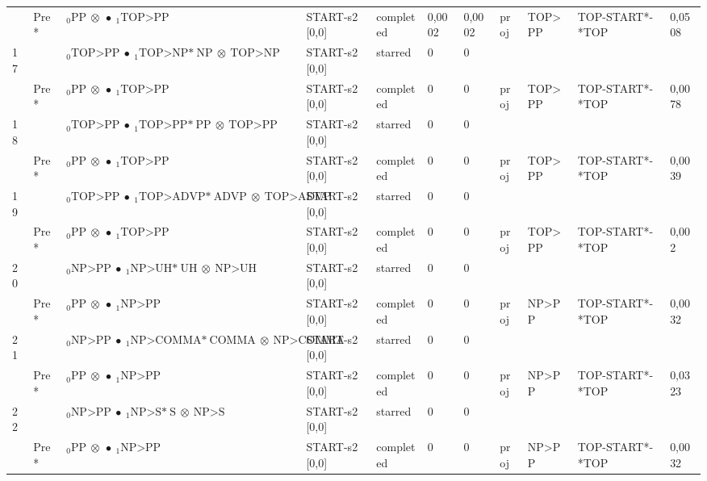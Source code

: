\documentclass[10pt]{article}
\begin{document}
\begin{longtable}[htbp]{lllllllllll}
 & Pre *& $ {}_0 \textrm{PP} \  \otimes \  \bullet \ {}_{1} \textrm{TOP>PP} $ & START-s2 [0,0] & completed & 0,0002 & 0,0002 & proj & TOP>PP & TOP-START*-*TOP & 0,0508 \\ 
17 & & $ {}_0 \textrm{TOP>PP} \  \bullet \ {}_{1} \textrm{TOP>NP*} \ \textrm{NP} \  \otimes \ \textrm{TOP>NP} $ & START-s2 [0,0] & starred & 0 & 0 & & & & \\ 
 & Pre *& $ {}_0 \textrm{PP} \  \otimes \  \bullet \ {}_{1} \textrm{TOP>PP} $ & START-s2 [0,0] & completed & 0 & 0 & proj & TOP>PP & TOP-START*-*TOP & 0,0078 \\ 
18 & & $ {}_0 \textrm{TOP>PP} \  \bullet \ {}_{1} \textrm{TOP>PP*} \ \textrm{PP} \  \otimes \ \textrm{TOP>PP} $ & START-s2 [0,0] & starred & 0 & 0 & & & & \\ 
 & Pre *& $ {}_0 \textrm{PP} \  \otimes \  \bullet \ {}_{1} \textrm{TOP>PP} $ & START-s2 [0,0] & completed & 0 & 0 & proj & TOP>PP & TOP-START*-*TOP & 0,0039 \\ 
19 & & $ {}_0 \textrm{TOP>PP} \  \bullet \ {}_{1} \textrm{TOP>ADVP*} \ \textrm{ADVP} \  \otimes \ \textrm{TOP>ADVP} $ & START-s2 [0,0] & starred & 0 & 0 & & & & \\ 
 & Pre *& $ {}_0 \textrm{PP} \  \otimes \  \bullet \ {}_{1} \textrm{TOP>PP} $ & START-s2 [0,0] & completed & 0 & 0 & proj & TOP>PP & TOP-START*-*TOP & 0,002 \\ 
20 & & $ {}_0 \textrm{NP>PP} \  \bullet \ {}_{1} \textrm{NP>UH*} \ \textrm{UH} \  \otimes \ \textrm{NP>UH} $ & START-s2 [0,0] & starred & 0 & 0 & & & & \\ 
 & Pre *& $ {}_0 \textrm{PP} \  \otimes \  \bullet \ {}_{1} \textrm{NP>PP} $ & START-s2 [0,0] & completed & 0 & 0 & proj & NP>PP & TOP-START*-*TOP & 0,0032 \\ 
21 & & $ {}_0 \textrm{NP>PP} \  \bullet \ {}_{1} \textrm{NP>COMMA*} \ \textrm{COMMA} \  \otimes \ \textrm{NP>COMMA} $ & START-s2 [0,0] & starred & 0 & 0 & & & & \\ 
 & Pre *& $ {}_0 \textrm{PP} \  \otimes \  \bullet \ {}_{1} \textrm{NP>PP} $ & START-s2 [0,0] & completed & 0 & 0 & proj & NP>PP & TOP-START*-*TOP & 0,0323 \\ 
22 & & $ {}_0 \textrm{NP>PP} \  \bullet \ {}_{1} \textrm{NP>S*} \ \textrm{S} \  \otimes \ \textrm{NP>S} $ & START-s2 [0,0] & starred & 0 & 0 & & & & \\ 
 & Pre *& $ {}_0 \textrm{PP} \  \otimes \  \bullet \ {}_{1} \textrm{NP>PP} $ & START-s2 [0,0] & completed & 0 & 0 & proj & NP>PP & TOP-START*-*TOP & 0,0032 \\ 

\end{longtable}
\end{document}
